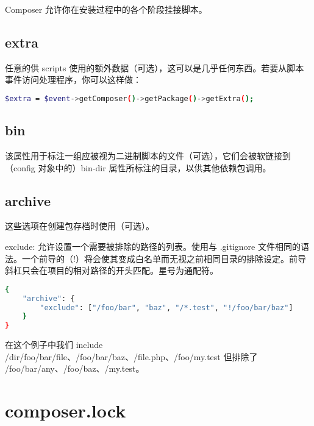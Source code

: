 Composer 允许你在安装过程中的各个阶段挂接脚本。

\subsection{extra}

任意的供 scripts 使用的额外数据（可选），这可以是几乎任何东西。若要从脚本事件访问处理程序，你可以这样做：





\begin{lstlisting}[language=bash]
$extra = $event->getComposer()->getPackage()->getExtra();
\end{lstlisting}


\subsection{bin}

该属性用于标注一组应被视为二进制脚本的文件（可选），它们会被软链接到（config 对象中的）bin-dir 属性所标注的目录，以供其他依赖包调用。

\subsection{archive}

这些选项在创建包存档时使用（可选）。



\begin{compactitem}
\item exclude: 允许设置一个需要被排除的路径的列表。使用与 .gitignore 文件相同的语法。一个前导的（!）将会使其变成白名单而无视之前相同目录的排除设定。前导斜杠只会在项目的相对路径的开头匹配。星号为通配符。
\end{compactitem}

\begin{lstlisting}[language=bash]
{
    "archive": {
        "exclude": ["/foo/bar", "baz", "/*.test", "!/foo/bar/baz"]
    }
}
\end{lstlisting}


在这个例子中我们 include /dir/foo/bar/file、/foo/bar/baz、/file.php、/foo/my.test 但排除了 /foo/bar/any、/foo/baz、/my.test。



\section{composer.lock}

